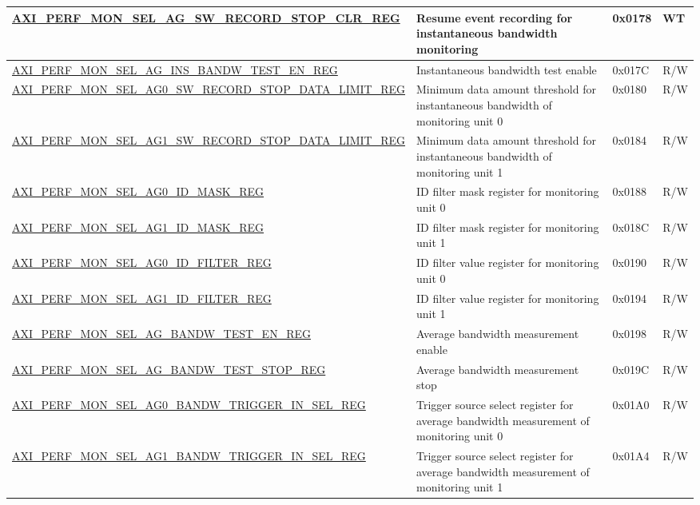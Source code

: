 \begin{longtable}{ | p{9.1cm} | p{5cm} | p{1.3cm} | p{1.4cm} | }
\hyperref[regdesc:AXIPERFMONSELAGSWRECORDSTOPCLRREG]{AXI\_PERF\_MON\_SEL\_AG\_SW\_RECORD\_STOP\_CLR\_REG} & Resume event recording for instantaneous bandwidth monitoring & 0x0178 & WT\\ \hline
\hyperref[regdesc:AXIPERFMONSELAGINSBANDWTESTENREG]{AXI\_PERF\_MON\_SEL\_AG\_INS\_BANDW\_TEST\_EN\_REG} & Instantaneous bandwidth test enable & 0x017C & R/W\\ \hline
\hyperref[regdesc:AXIPERFMONSELAGNSWRECORDSTOPDATALIMITREG]{AXI\_\-PERF\_\-MON\_\-SEL\_\-AG0\_\-SW\_\-RECORD\_\-STOP\_\-DATA\_\-LIMIT\_\-REG} & Minimum data amount threshold for instantaneous bandwidth of monitoring unit 0 & 0x0180 & R/W \\ \hline
\hyperref[regdesc:AXIPERFMONSELAGNSWRECORDSTOPDATALIMITREG]{AXI\_\-PERF\_\-MON\_\-SEL\_\-AG1\_\-SW\_\-RECORD\_\-STOP\_\-DATA\_\-LIMIT\_\-REG} & Minimum data amount threshold for instantaneous bandwidth of monitoring unit 1 & 0x0184 & R/W \\ \hline
\hyperref[regdesc:AXIPERFMONSELAGNIDMASKREG]{AXI\_PERF\_MON\_SEL\_AG0\_ID\_MASK\_REG} & ID filter mask register for monitoring unit 0 & 0x0188 & R/W\\ \hline
\hyperref[regdesc:AXIPERFMONSELAGNIDMASKREG]{AXI\_PERF\_MON\_SEL\_AG1\_ID\_MASK\_REG} & ID filter mask register for monitoring unit 1 & 0x018C & R/W\\ \hline
\hyperref[regdesc:AXIPERFMONSELAGNIDFILTERREG]{AXI\_PERF\_MON\_SEL\_AG0\_ID\_FILTER\_REG} & ID filter value register for monitoring unit 0 & 0x0190 & R/W\\ \hline
\hyperref[regdesc:AXIPERFMONSELAGNIDFILTERREG]{AXI\_PERF\_MON\_SEL\_AG1\_ID\_FILTER\_REG} & ID filter value register for monitoring unit 1 & 0x0194 & R/W\\ \hline
\hyperref[regdesc:AXIPERFMONSELAGBANDWTESTENREG]{AXI\_PERF\_MON\_SEL\_AG\_BANDW\_TEST\_EN\_REG} & Average bandwidth measurement enable & 0x0198 & R/W\\ \hline
\hyperref[regdesc:AXIPERFMONSELAGBANDWTESTSTOPREG]{AXI\_PERF\_MON\_SEL\_AG\_BANDW\_TEST\_STOP\_REG} & Average bandwidth measurement stop & 0x019C & R/W\\ \hline
\hyperref[regdesc:AXIPERFMONSELAGNBANDWTRIGGERINSELREG]{AXI\_PERF\_MON\_SEL\_AG0\_BANDW\_TRIGGER\_IN\_SEL\_REG} & Trigger source select register for average bandwidth measurement of monitoring unit 0 & 0x01A0 & R/W\\ \hline
\hyperref[regdesc:AXIPERFMONSELAGNBANDWTRIGGERINSELREG]{AXI\_PERF\_MON\_SEL\_AG1\_BANDW\_TRIGGER\_IN\_SEL\_REG} & Trigger source select register for average bandwidth measurement of monitoring unit 1 & 0x01A4 & R/W\\ \hline

\end{longtable}
